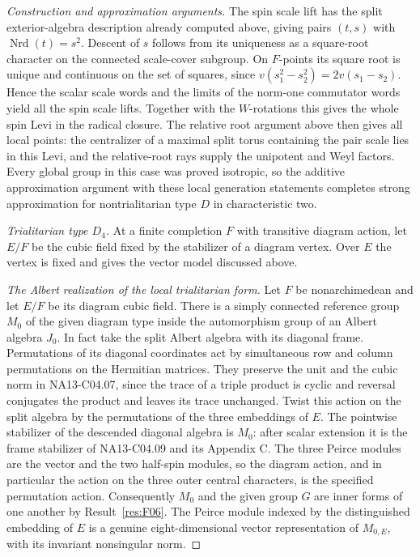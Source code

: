 \documentclass[11pt,a4paper,openany,oneside]{book}
\theoremstyle{resultstyle}
\theoremstyle{definition}
\numberwithin{equation}{chapter}
\begin{document}
\begin{proof}[Construction and approximation arguments]
The spin scale lift has the split exterior-algebra description
already computed above, giving pairs \((t,s)\) with
\(\operatorname{Nrd}(t)=s^2\). Descent of \(s\) follows from
its uniqueness as a square-root character on the connected
scale-cover subgroup. On \(F\)-points its square root is
unique and continuous on the set of squares, since
\(v(s_1^2-s_2^2)=2v(s_1-s_2)\). Hence the scalar scale words
and the limits of the norm-one commutator words yield all the
spin scale lifts. Together with the \(W\)-rotations this
gives the whole spin Levi in the radical closure.
The relative root argument above then gives all local points:
the centralizer of a maximal split torus containing the pair
scale lies in this Levi, and the relative-root rays supply the
unipotent and Weyl factors. Every global group in this case
was proved isotropic, so the additive approximation argument
with these local generation statements completes strong
approximation for nontrialitarian type \(D\) in characteristic two.

\medskip\noindent
\textit{Trialitarian type \(D_4\).}
At a finite completion \(F\) with transitive diagram action,
let \(E/F\) be the cubic field fixed by the stabilizer of a
diagram vertex. Over \(E\) the vertex is fixed and gives the
vector model discussed above.

\emph{The Albert realization of the local trialitarian form.}
Let \(F\) be nonarchimedean and let \(E/F\) be its diagram cubic
field. There is a simply connected reference group \(M_0\) of
the given diagram type inside the automorphism group of an
Albert algebra \(J_0\). In fact take the split Albert algebra
with its diagonal frame. Permutations of its diagonal coordinates
act by simultaneous row and column permutations on the Hermitian
matrices. They preserve the unit and the cubic norm in
NA13-C04.07, since the trace of a triple product is cyclic and
reversal conjugates the product and leaves its trace unchanged.
Twist this action on the split algebra by the permutations of
the three embeddings of \(E\). The pointwise stabilizer of the
descended diagonal algebra is \(M_0\): after scalar extension it is
the frame stabilizer of NA13-C04.09 and its Appendix C.
The three Peirce modules are the vector and the two half-spin
modules, so the diagram action, and in particular the action on
the three outer central characters, is the specified permutation
action. Consequently \(M_0\) and the given group \(G\) are inner
forms of one another by Result~\ref{res:F06}. The Peirce module
indexed by the distinguished embedding of \(E\) is a genuine
eight-dimensional vector representation of \(M_{0,E}\),
with its invariant nonsingular norm.


\end{proof}
\end{document}
